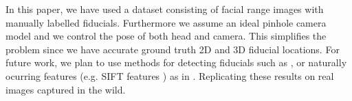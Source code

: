\documentclass[runningheads]{llncs}
\begin{document}
In this paper, we have used a dataset consisting of facial range images with manually labelled fiducials.    
Furthermore we assume an ideal pinhole camera model and we control the pose of both head and camera.  
This simplifies the problem since we have accurate ground truth 2D and 3D fiducial locations. 
For future work, we plan to use methods for detecting fiducials such as \cite{belhumeur2011localizing}, or naturally ocurring features (e.g. SIFT features \cite{lowe}) as in \cite{ohayon2006robust}.
Replicating these results on real images captured in the wild.




\end{document}
